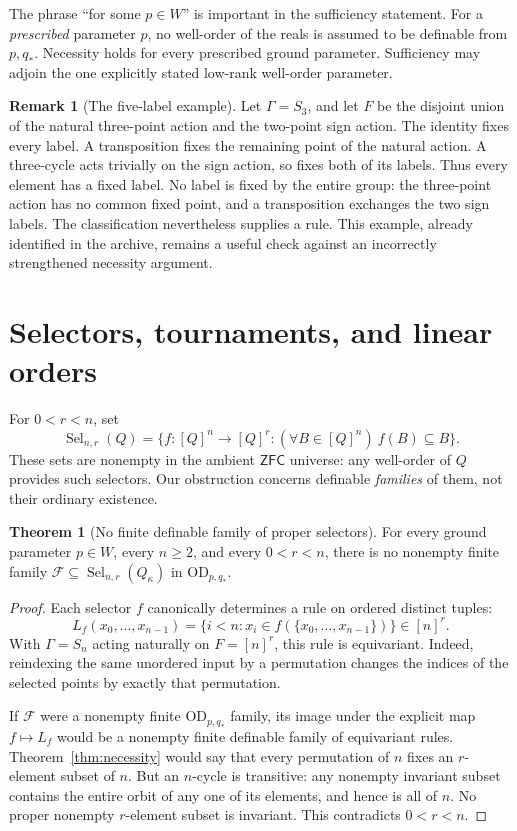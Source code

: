 \documentclass[11pt,letterpaper]{article}
\theoremstyle{definition}
\newtheorem{theorem}[definition]{Theorem}
\newtheorem{remark}[definition]{Remark}
\numberwithin{equation}{section}
\newcommand{\ZFC}{\mathsf{ZFC}}
\newcommand{\OD}{\mathrm{OD}}
\newcommand{\Sel}{\operatorname{Sel}}
\begin{document}
The phrase ``for some $p\in W$'' is important in the sufficiency statement.
For a \emph{prescribed} parameter $p$, no well-order of the reals is assumed
to be definable from $p,q_*$. Necessity holds for every prescribed ground
parameter. Sufficiency may adjoin the one explicitly stated low-rank
well-order parameter.

\begin{remark}[The five-label example]
Let $\Gamma=S_3$, and let $F$ be the disjoint union of the natural three-point
action and the two-point sign action. The identity fixes every label. A
transposition fixes the remaining point of the natural action. A three-cycle
acts trivially on the sign action, so fixes both of its labels. Thus every
element has a fixed label. No label is fixed by the entire group: the
three-point action has no common fixed point, and a transposition exchanges
the two sign labels. The classification nevertheless supplies a rule.
This example, already identified in the archive, remains a useful check
against an incorrectly strengthened necessity argument.
\end{remark}

\section{Selectors, tournaments, and linear orders}\label{sec:selectors}

For $0<r<n$, set
\[
 \Sel_{n,r}(Q)=\{f:[Q]^n\to[Q]^r:
                         (\forall B\in[Q]^n)\ f(B)\subseteq B\}.
\]
These sets are nonempty in the ambient $\ZFC$ universe: any well-order of
$Q$ provides such selectors. Our obstruction concerns definable
\emph{families} of them, not their ordinary existence.

\begin{theorem}[No finite definable family of proper selectors]\label{thm:selectors}
For every ground parameter $p\in W$, every $n\ge2$, and every $0<r<n$,
there is no nonempty finite family
$\mathscr F\subseteq\Sel_{n,r}(Q_\kappa)$ in $\OD_{p,q_*}$.
\end{theorem}

\begin{proof}
Each selector $f$ canonically determines a rule on ordered distinct tuples:
\begin{equation}\label{eq:selectorlabel}
 L_f(x_0,\ldots,x_{n-1})
       =\{i<n:x_i\in f(\{x_0,\ldots,x_{n-1}\})\}\in[n]^r.
\end{equation}
With $\Gamma=S_n$ acting naturally on $F=[n]^r$, this rule is equivariant.
Indeed, reindexing the same unordered input by a permutation changes the
indices of the selected points by exactly that permutation.

If $\mathscr F$ were a nonempty finite $\OD_{p,q_*}$ family, its image under
the explicit map $f\mapsto L_f$ would be a nonempty finite definable family
of equivariant rules. Theorem~\ref{thm:necessity} would say that every
permutation of $n$ fixes an $r$-element subset of $n$. But an $n$-cycle is
transitive: any nonempty invariant subset contains the entire orbit of
any one of its elements, and hence is all of $n$. No proper nonempty
$r$-element subset is invariant. This contradicts $0<r<n$.
\end{proof}
\end{document}
